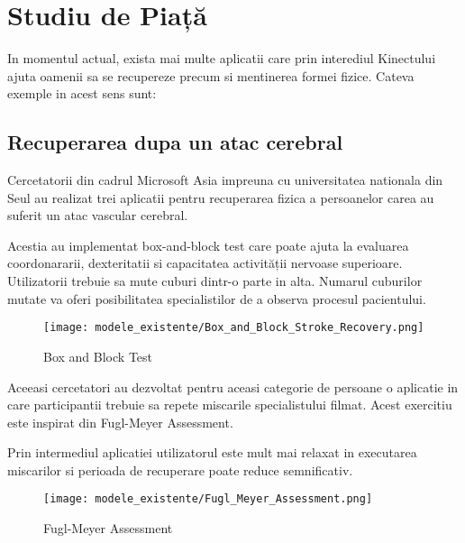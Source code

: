 \documentclass[12pt,a4paper]{report}
\begin{document}
\chapter{Studiu de Piață}

In momentul actual, exista mai multe aplicatii care prin interediul Kinectului ajuta oamenii sa se recupereze precum si mentinerea formei fizice. Cateva exemple in acest sens sunt:


\section{Recuperarea dupa un atac cerebral}

Cercetatorii din cadrul Microsoft Asia impreuna cu universitatea nationala din Seul au realizat trei aplicatii pentru recuperarea fizica a persoanelor carea au suferit un atac vascular cerebral. 

Acestia au implementat box-and-block test care poate ajuta la evaluarea coordonararii, dexteritatii si capacitatea activității nervoase superioare. Utilizatorii trebuie sa mute cuburi dintr-o parte in alta. Numarul cuburilor mutate va oferi posibilitatea specialistilor de a observa procesul pacientului.

\begin{figure}[th]
\centering
\texttt{[image: modele\_existente/Box\_and\_Block\_Stroke\_Recovery.png]}
  \caption[Box and Block Test]{Box and Block Test\protect\footnotemark}
  \label{figure_1:picture_2}
\end{figure}

Aceeasi cercetatori au dezvoltat pentru aceasi categorie de persoane o aplicatie in care participantii trebuie sa repete miscarile specialistului filmat. Acest exercitiu este inspirat din Fugl-Meyer Assessment.

Prin intermediul aplicatiei utilizatorul este mult mai relaxat in executarea miscarilor si perioada de recuperare poate reduce semnificativ.

\begin{figure}[th]
\centering
\texttt{[image: modele\_existente/Fugl\_Meyer\_Assessment.png]}
  \caption[Fugl-Meyer Assessment]{Fugl-Meyer Assessment\protect\footnotemark}
  \label{figure_1:picture_3}
\end{figure}
\end{document}

